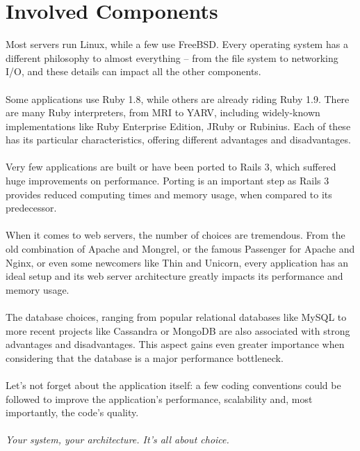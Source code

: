 \section{Involved Components}
Most servers run Linux, while a few use FreeBSD. Every operating system has a different philosophy to almost everything – from the file system to networking I/O, and these details can impact all the other components.\\\\
Some applications use Ruby 1.8, while others are already riding Ruby 1.9. There are many Ruby interpreters, from MRI to YARV, including widely-known implementations like Ruby Enterprise Edition, JRuby or Rubinius. Each of these has its particular characteristics, offering different advantages and disadvantages.\\\\
Very few applications are built or have been ported to Rails 3, which suffered huge improvements on performance. Porting is an important step as Rails 3 provides reduced computing times and memory usage, when compared to its predecessor.\\\\
When it comes to web servers, the number of choices are tremendous. From the old combination of Apache and Mongrel, or the famous Passenger for Apache and Nginx, or even some newcomers like Thin and Unicorn, every application has an ideal setup and its web server architecture greatly impacts its performance and memory usage.\\\\
The database choices, ranging from popular relational databases like MySQL to more recent projects like Cassandra or MongoDB are also associated with strong advantages and disadvantages. This aspect gains even greater importance when considering that the database is a major performance bottleneck.\\\\
Let's not forget about the application itself: a few coding conventions could be followed to improve the application's performance, scalability and, most importantly, the code's quality.\\\\
\textit{Your system, your architecture. It's all about choice.}

